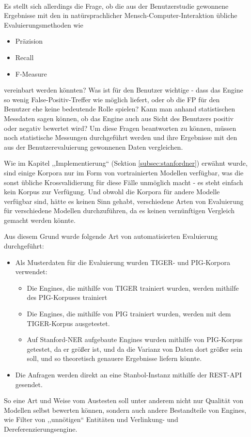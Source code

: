 \paragraph{}
Es stellt sich allerdings die Frage, ob die aus der Benutzerstudie gewonnene Ergebnisse mit den in natürsprachlicher Mensch-Computer-Interaktion übliche Evaluierungsmethoden wie 
\begin{itemize}
\item Präzision
\item Recall
\item F-Measure
\end{itemize}
vereinbart werden könnten? Was ist für den Benutzer wichtige - dass das Engine so wenig False-Positiv-Treffer wie möglich liefert, oder ob die FP für den Benutzer ehe keine bedeutende Rolle spielen? Kann man anhand statistischen Messdaten sagen können, ob das Engine auch aus Sicht des Benutzers positiv oder negativ bewertet wird? Um diese Fragen beantworten zu können, müssen noch statistische Messungen durchgeführt werden und ihre Ergebnisse mit den aus der Benutzerevaluierung gewonnenen Daten vergleichen.

Wie im Kapitel ,,Implementierung`` (Sektion \ref{subsec:stanfordner}) erwähnt wurde, sind einige Korpora nur im Form von vortrainierten Modellen verfügbar, was die sonst übliche Krossvalidierung für diese Fälle unmöglich macht - es steht einfach kein Korpus zur Verfügung. Und obwohl die Korpora für andere Modelle verfügbar sind, hätte es keinen Sinn gehabt, verschiedene Arten von Evaluierung für verschiedene Modellen durchzuführen, da es keinen vernünftigen Vergleich gemacht werden könnte.

Aus diesem Grund wurde folgende Art von automatisierten Evaluierung durchgeführt:
\begin{itemize}
\item Als Musterdaten für die Evaluierung wurden TIGER- und PIG-Korpora verwendet:
\begin{itemize}
\item Die Engines, die mithilfe von TIGER trainiert wurden, werden mithilfe des PIG-Korpuses trainiert
\item Die Engines, die mithilfe von PIG trainiert wurden, werden mit dem TIGER-Korpus ausgetestet.
\item Auf Stanford-NER aufgebaute Engines wurden mithilfe von PIG-Korpus getestet, da er größer ist, und da die Varianz von Daten dort größer sein soll, und so theoretisch genauere Ergebnisse liefern könnte.
\end{itemize}
\item Die Anfragen werden direkt an eine Stanbol-Instanz mithilfe der REST-API gesendet.
\end{itemize}
So eine Art und Weise vom Austesten soll unter anderem nicht nur Qualität von Modellen selbst bewerten können, sondern auch andere Bestandteile von Engines, wie Filter von ,,unnötigen`` Entitäten und Verlinkung- und Dereferenzierungsengine.

